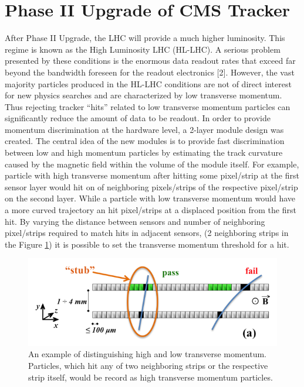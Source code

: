 \section{Phase II Upgrade of CMS Tracker}

After Phase II Upgrade, the LHC will provide a much higher luminosity. This regime is known as the High Luminosity LHC (HL-LHC). A serious problem presented by these conditions is the enormous data readout rates that exceed far beyond the bandwidth foreseen for the readout electronics [2].
However, the vast majority particles produced in the HL-LHC conditions are not of direct interest for new physics searches and are characterized by low transverse momentum. Thus rejecting tracker “hits” related to low transverse momentum particles can significantly reduce the amount of data to be readout. In order to provide momentum discrimination at the hardware level, a 2-layer module design was created. The central idea of the new modules is to provide fast discrimination between low and high momentum particles by estimating the track curvature caused by the magnetic field within the volume of the module itself. For example, particle with high transverse momentum after hitting some pixel/strip at the first sensor layer would hit on of neighboring pixels/strips of the respective pixel/strip on the second layer. While a particle with low transverse momentum would have a more curved trajectory an hit pixel/strips at a displaced position from the first hit. By varying the distance between sensors and number of neighboring pixel/strips required to match hits in adjacent sensors, (2 neighboring strips in the Figure \ref{fig:low_high_pT}) it is possible to set the transverse momentum threshold for a hit.


\begin{figure}[ht]\centering
\includegraphics[width=0.8\linewidth]{Data/Introduction/Low_high_pT.png}
\caption{An example of distinguishing high and low transverse momentum. Particles, which hit any of two neighboring strips or the respective strip itself, would be record as high transverse momentum particles.}
\label{fig:low_high_pT}
\end{figure}


